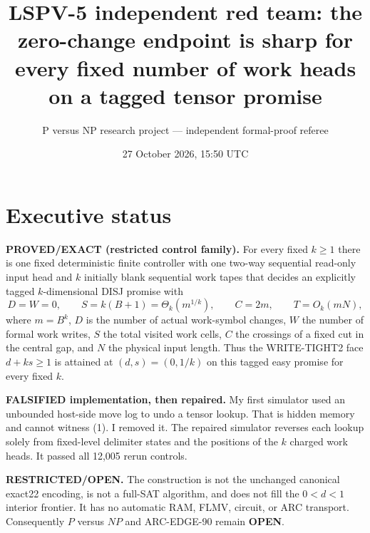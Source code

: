 \documentclass[11pt]{article}
\title{LSPV-5 independent red team: the zero-change endpoint is sharp for every fixed number of work heads on a tagged tensor promise}
\author{P versus NP research project --- independent formal-proof referee}
\date{27 October 2026, 15:50 UTC}
\begin{document}
\maketitle

\section*{Executive status}
\textbf{PROVED/EXACT (restricted control family).}  For every fixed
$k\geq1$ there is one fixed deterministic finite controller with one two-way
sequential read-only input head and $k$ initially blank sequential work tapes
that decides an explicitly tagged $k$-dimensional DISJ promise with
\[
 D=W=0,\qquad S=k(B+1)=\Theta_k(m^{1/k}),\qquad C=2m,
 \qquad T=O_k(mN),                                    \tag{1}
\]
where $m=B^k$, $D$ is the number of actual work-symbol changes, $W$ the
number of formal work writes, $S$ the total visited work cells, $C$ the
crossings of a fixed cut in the central gap, and $N$ the physical input
length.  Thus the WRITE-TIGHT2 face $d+ks\geq1$ is attained at
$(d,s)=(0,1/k)$ on this tagged easy promise for every fixed $k$.

\textbf{FALSIFIED implementation, then repaired.}  My first simulator used
an unbounded host-side move log to undo a tensor lookup.  That is hidden
memory and cannot witness (1).  I removed it.  The repaired simulator reverses
each lookup solely from fixed-level delimiter states and the positions of the
$k$ charged work heads.  It passed all 12,005 rerun controls.

\textbf{RESTRICTED/OPEN.}  The construction is not the unchanged canonical
exact22 encoding, is not a full-SAT algorithm, and does not fill the
$0<d<1$ interior frontier.  It has no automatic RAM, FLMV, circuit, or ARC
transport.  Consequently $P$ versus $NP$ and ARC-EDGE-90 remain
\textbf{OPEN}.
\end{document}
